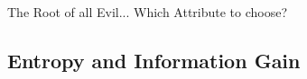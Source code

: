 \begin{frame}{The Root of all Evil... Which Attribute to choose?}{}

\end{frame}


\subsection{Entropy and Information Gain}

